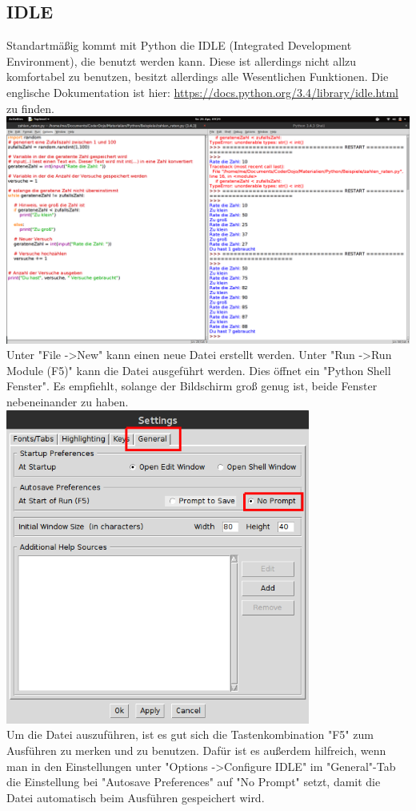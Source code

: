 \documentclass[ngerman,oneside, a4letter]{scrbook}
\begin{document}
\subsection{IDLE}
Standartmäßig kommt mit Python die IDLE (Integrated Development Environment), die benutzt werden kann. Diese ist allerdings nicht allzu komfortabel zu benutzen, besitzt allerdings alle Wesentlichen Funktionen. Die englische Dokumentation ist hier: \url{https://docs.python.org/3.4/library/idle.html} zu finden.
\\
\includegraphics[width=150mm]{bilder/idle}
Unter "File -\textgreater New" kann einen neue Datei erstellt werden. Unter "Run -\textgreater Run Module (F5)" kann die Datei ausgeführt werden. Dies öffnet ein "Python Shell Fenster". Es empfiehlt, solange der Bildschirm groß genug ist, beide Fenster nebeneinander zu haben.
\\


\includegraphics[width=100mm]{bilder/auto_save}
\\
Um die Datei auszuführen, ist es gut sich die Tastenkombination "F5" zum Ausführen zu merken und zu benutzen. Dafür ist es außerdem hilfreich, wenn man in den Einstellungen unter "Options -\textgreater Configure IDLE" im "General"-Tab die Einstellung bei "Autosave Preferences" auf "No Prompt" setzt, damit die Datei automatisch beim Ausführen gespeichert wird.
\end{document}
